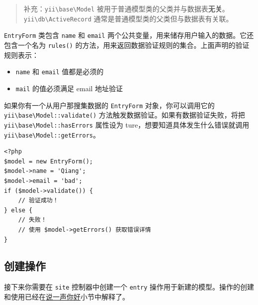 \begin{quote}补充：\texttt{yii{\allowbreak{}\textbackslash}base{\allowbreak{}\textbackslash}Model} 被用于普通模型类的父类并与数据表\textbf{无关}。\texttt{yii{\allowbreak{}\textbackslash}db{\allowbreak{}\textbackslash}ActiveRecord} 通常是普通模型类的父类但与数据表有关联。

\end{quote}
\lstinline|EntryForm| 类包含 \lstinline|name| 和 \lstinline|email| 两个公共变量，用来储存用户输入的数据。它还包含一个名为 \lstinline|rules()| 的方法，用来返回数据验证规则的集合。上面声明的验证规则表示：

\begin{itemize}
\item \lstinline|name| 和 \lstinline|email| 值都是必须的
\item \lstinline|mail| 的值必须满足 email 地址验证
\end{itemize}
如果你有一个从用户那搜集数据的 \lstinline|EntryForm| 对象，你可以调用它的 \texttt{yii{\allowbreak{}\textbackslash}base{\allowbreak{}\textbackslash}Model\allowbreak{}::\allowbreak{}validate()} 方法触发数据验证。如果有数据验证失败，将把 \texttt{yii{\allowbreak{}\textbackslash}base{\allowbreak{}\textbackslash}Model\allowbreak{}::\allowbreak{}hasErrors} 属性设为 ture，想要知道具体发生什么错误就调用 \texttt{yii{\allowbreak{}\textbackslash}base{\allowbreak{}\textbackslash}Model\allowbreak{}::\allowbreak{}getErrors}。

\lstset{language=php}\begin{lstlisting}
<?php
$model = new EntryForm();
$model->name = 'Qiang';
$model->email = 'bad';
if ($model->validate()) {
    // 验证成功！
} else {
    // 失败！
    // 使用 $model->getErrors() 获取错误详情
}
\end{lstlisting}
\subsection{创建操作 \label{start-forms.md::creating-action}}
接下来你需要在 \lstinline|site| 控制器中创建一个 \lstinline|entry| 操作用于新建的模型。操作的创建和使用已经在\hyperref[start-hello.md]{说一声你好}小节中解释了。

